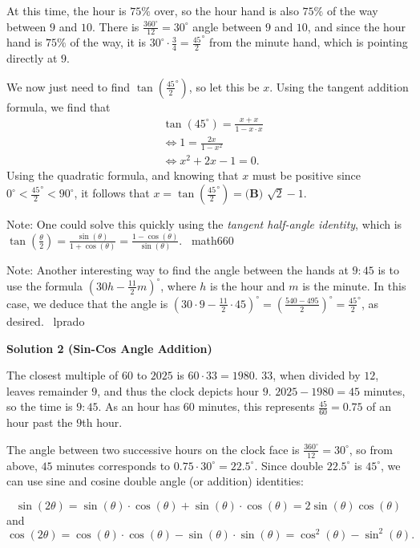 \begin{enumerate}
 At this time, the hour is $75\%$ over, so the hour hand is also $75\%$ of the way between $9$ and $10$. There is $\frac{360^{\circ}}{12} = 30^{\circ}$ angle between $9$ and $10$, and since the hour hand is $75\%$ of the way, it is $30^\circ \cdot \frac{3}{4} = \frac{45}{2}^{\circ}$ from the minute hand, which is pointing directly at $9$.

 We now just need to find $\tan\left(\frac{45}{2}^{\circ}\right)$, so let this be $x$. Using the tangent addition formula, we find that 
 \begin{align*}&\tan\left(45^{\circ}\right) = \frac{x + x}{1 - x\cdot x} \\ &\iff 1 = \frac{2x}{1-x^2} \\  &\iff x^2+2x-1 = 0.\end{align*}
Using the quadratic formula, and knowing that $x$ must be positive since $0^{\circ} < \frac{45}{2}^{\circ} < 90^{\circ}$, it follows that $x = \tan\left(\frac{45}{2}^{\circ}\right) = \boxed{\textbf{(B) } \sqrt{2}-1}$.

 
Note: One could solve this quickly using the \textit{tangent half-angle identity}, which is $\tan\left(\frac{\theta}{2}\right) = \frac{\sin(\theta)}{1+\cos(\theta)} = \frac{1-\cos(\theta)}{\sin(\theta)}$. ~math660

 
Note: Another interesting way to find the angle between the hands at $9:45$ is to use the formula $\left(30h - \frac{11}{2}m\right)^{\circ}$, where $h$ is the hour and $m$ is the minute. In this case, we deduce that the angle is $\left(30 \cdot 9 - \frac{11}{2} \cdot 45\right)^{\circ} = \left(\frac{540-495}{2}\right)^{\circ} = \frac{45}{2}^{\circ}$, as desired. ~lprado

 



\textbf{Solution 2 (Sin-Cos Angle Addition)}

The closest multiple of $60$ to $2025$ is $60 \cdot 33 = 1980$. $33$, when divided by $12$, leaves remainder $9$, and thus the clock depicts hour $9$. $2025 - 1980 = 45$ minutes, so the time is $9:45$. As an hour has $60$ minutes, this represents $\frac{45}{60} = 0.75$ of an hour past the $9$th hour. 

 The angle between two successive hours on the clock face is $\frac{360^{\circ}}{12} = 30^{\circ}$, so from above, $45$ minutes corresponds to $0.75 \cdot 30^{\circ} = 22.5^{\circ}$. Since double $22.5^{\circ}$ is $45^{\circ}$, we can use sine and cosine double angle (or addition) identities:

 
 \[\sin(2 \theta)=\sin(\theta)\cdot\cos(\theta)+\sin(\theta)\cdot\cos(\theta)=2 \sin(\theta)\cos(\theta)\]and
 \[\cos(2 \theta)=\cos(\theta)\cdot\cos(\theta)-\sin(\theta)\cdot\sin(\theta)=\cos^2(\theta)-\sin^2(\theta).\]


\end{enumerate}
